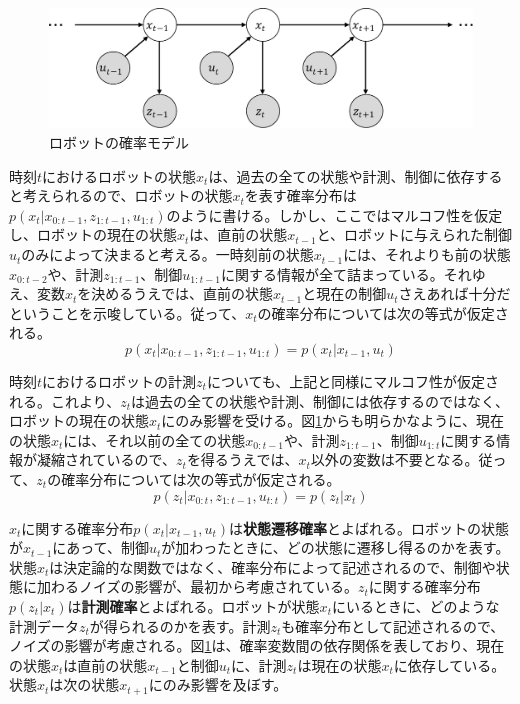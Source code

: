 \documentclass[dvipdfmx,a4paper]{jsarticle}
\begin{document}
\begin{figure}[htbp]
	\centering
	\includegraphics[keepaspectratio, scale=0.75]{figures/dynamic-bayes-network.pdf}
	\caption{ロボットの確率モデル}
	\label{fig:dynamic-bayes-network}
\end{figure}

時刻$t$におけるロボットの状態$x_t$は、過去の全ての状態や計測、制御に依存すると考えられるので、ロボットの状態$x_t$を表す確率分布は$p(x_t | x_{0 : t - 1}, z_{1 : t - 1}, u_{1 : t})$のように書ける。しかし、ここではマルコフ性を仮定し、ロボットの現在の状態$x_t$は、直前の状態$x_{t - 1}$と、ロボットに与えられた制御$u_t$のみによって決まると考える。一時刻前の状態$x_{t - 1}$には、それよりも前の状態$x_{0 : t - 2}$や、計測$z_{1 : t - 1}$、制御$u_{1 : t - 1}$に関する情報が全て詰まっている。それゆえ、変数$x_t$を決めるうえでは、直前の状態$x_{t - 1}$と現在の制御$u_t$さえあれば十分だということを示唆している。従って、$x_t$の確率分布については次の等式が仮定される。
\begin{equation}
	p(x_t | x_{0 : t - 1}, z_{1 : t - 1}, u_{1 : t}) = p(x_t | x_{t - 1}, u_t) \label{eq:transition-prob}
\end{equation}

時刻$t$におけるロボットの計測$z_t$についても、上記と同様にマルコフ性が仮定される。これより、$z_t$は過去の全ての状態や計測、制御には依存するのではなく、ロボットの現在の状態$x_t$にのみ影響を受ける。図\ref{fig:dynamic-bayes-network}からも明らかなように、現在の状態$x_t$には、それ以前の全ての状態$x_{0 : t - 1}$や、計測$z_{1 : t - 1}$、制御$u_{1 : t}$に関する情報が凝縮されているので、$z_t$を得るうえでは、$x_t$以外の変数は不要となる。従って、$z_t$の確率分布については次の等式が仮定される。
\begin{equation}
	p(z_t | x_{0 : t}, z_{1 : t - 1}, u_{t : t}) = p(z_t | x_t) \label{eq:observation-prob}
\end{equation}

$x_t$に関する確率分布$p(x_t | x_{t - 1}, u_t)$は\textbf{状態遷移確率}とよばれる。ロボットの状態が$x_{t - 1}$にあって、制御$u_t$が加わったときに、どの状態に遷移し得るのかを表す。状態$x_t$は決定論的な関数ではなく、確率分布によって記述されるので、制御や状態に加わるノイズの影響が、最初から考慮されている。$z_t$に関する確率分布$p(z_t | x_t)$は\textbf{計測確率}とよばれる。ロボットが状態$x_t$にいるときに、どのような計測データ$z_t$が得られるのかを表す。計測$z_t$も確率分布として記述されるので、ノイズの影響が考慮される。図\ref{fig:dynamic-bayes-network}は、確率変数間の依存関係を表しており、現在の状態$x_t$は直前の状態$x_{t - 1}$と制御$u_t$に、計測$z_t$は現在の状態$x_t$に依存している。状態$x_t$は次の状態$x_{t + 1}$にのみ影響を及ぼす。
\end{document}
